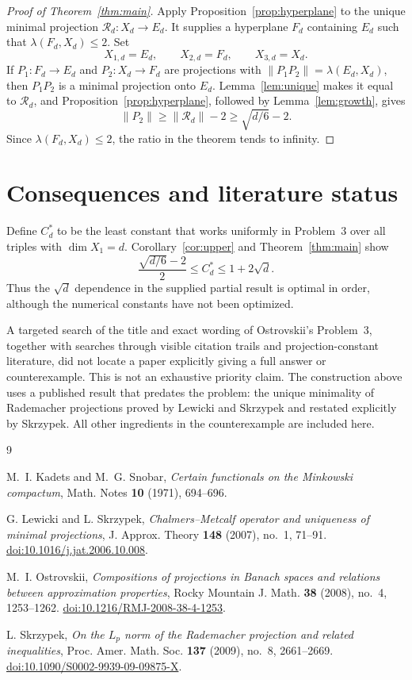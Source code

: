\documentclass[11pt]{article}
\theoremstyle{remark}
\begin{document}
\begin{proof}[Proof of Theorem~\ref{thm:main}]
Apply Proposition~\ref{prop:hyperplane} to the unique minimal projection
$\mathcal R_d:X_d\to E_d$.  It supplies a hyperplane $F_d$ containing
$E_d$ such that $\lambda(F_d,X_d)\leq2$.  Set
\[
       X_{1,d}=E_d,\qquad X_{2,d}=F_d,\qquad X_{3,d}=X_d.
\]
If $P_1:F_d\to E_d$ and $P_2:X_d\to F_d$ are projections with
$\|P_1P_2\|=\lambda(E_d,X_d)$, then $P_1P_2$ is a minimal projection onto
$E_d$.  Lemma~\ref{lem:unique} makes it equal to $\mathcal R_d$, and
Proposition~\ref{prop:hyperplane}, followed by Lemma~\ref{lem:growth}, gives
\[
       \|P_2\|\geq\|\mathcal R_d\|-2
                 \geq\sqrt{d/6}-2.
\]
Since $\lambda(F_d,X_d)\leq2$, the ratio in the theorem tends to infinity.
\end{proof}

\section{Consequences and literature status}

Define $C_d^*$ to be the least constant that works uniformly in Problem~3 over
all triples with $\dim X_1=d$.  Corollary~\ref{cor:upper} and
Theorem~\ref{thm:main} show
\[
 \frac{\sqrt{d/6}-2}{2}\leq C_d^*\leq1+2\sqrt d.
\]
Thus the $\sqrt d$ dependence in the supplied partial result is optimal in
order, although the numerical constants have not been optimized.

A targeted search of the title and exact wording of Ostrovskii's Problem~3,
together with searches through visible citation trails and projection-constant
literature, did not locate a paper explicitly giving a full answer or
counterexample.  This is not an exhaustive priority claim.  The construction
above uses a published result that predates the problem: the unique minimality
of Rademacher projections proved by Lewicki and Skrzypek and restated explicitly
by Skrzypek.  All other ingredients in the counterexample are included here.

\begin{thebibliography}{9}

M.~I. Kadets and M.~G. Snobar,
\emph{Certain functionals on the Minkowski compactum},
Math. Notes \textbf{10} (1971), 694--696.

G. Lewicki and L. Skrzypek,
\emph{Chalmers--Metcalf operator and uniqueness of minimal projections},
J. Approx. Theory \textbf{148} (2007), no.~1, 71--91.
\href{https://doi.org/10.1016/j.jat.2006.10.008}{doi:10.1016/j.jat.2006.10.008}.

M.~I. Ostrovskii,
\emph{Compositions of projections in Banach spaces and relations between
approximation properties},
Rocky Mountain J. Math. \textbf{38} (2008), no.~4, 1253--1262.
\href{https://doi.org/10.1216/RMJ-2008-38-4-1253}{doi:10.1216/RMJ-2008-38-4-1253}.

L. Skrzypek,
\emph{On the $L_p$ norm of the Rademacher projection and related inequalities},
Proc. Amer. Math. Soc. \textbf{137} (2009), no.~8, 2661--2669.
\href{https://doi.org/10.1090/S0002-9939-09-09875-X}{doi:10.1090/S0002-9939-09-09875-X}.

\end{thebibliography}
\end{document}
